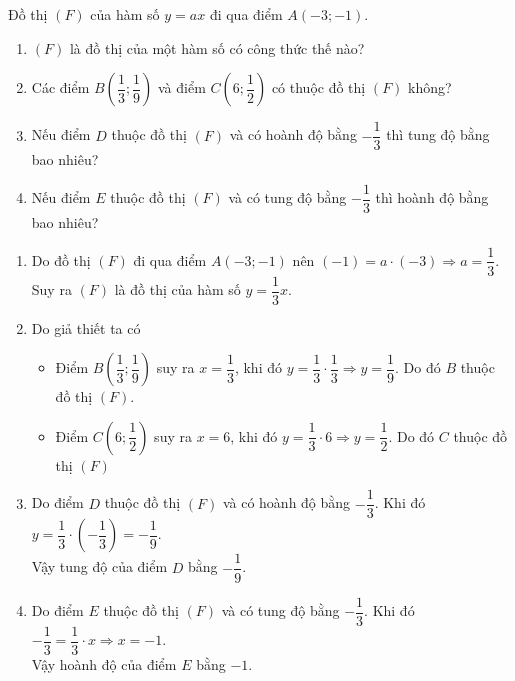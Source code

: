 \begin{bt}%
Đồ thị $\left(F\right)$	của hàm số $y = ax$ đi qua điểm $A\left(- 3; -1\right)$.
	\begin{enumerate}
		\item $\left(F\right)$ là đồ thị của một hàm số có công thức thế nào?
		\item Các điểm $B\left(\dfrac{1}{3}; \dfrac{1}{9}\right)$ và điểm  $C\left(6; \dfrac{1}{2}\right)$ có thuộc đồ thị $\left(F\right)$ không? 
		\item Nếu điểm $D$ thuộc đồ thị $\left(F\right)$ và có hoành độ bằng $-\dfrac{1}{3}$ thì tung độ bằng bao nhiêu? 
		\item Nếu điểm $E$ thuộc đồ thị $\left(F\right)$ và có tung  độ bằng $-\dfrac{1}{3}$ thì hoành độ bằng bao nhiêu?
	\end{enumerate}
	\loigiai
	{\begin{enumerate}
			\item Do đồ thị $\left(F\right)$ đi qua điểm $A\left(- 3; -1\right)$ nên  $(- 1) = a\cdot (- 3)\Rightarrow a = \dfrac{1}{3}$.\\
			Suy ra $\left(F\right)$ là đồ thị của hàm số $y = \dfrac{1}{3}x$. 
			\item Do giả thiết ta có
			\begin{itemize}
			\item Điểm $B\left(\dfrac{1}{3}; \dfrac{1}{9}\right)$ suy ra $x = \dfrac{1}{3}$, khi đó $y = \dfrac{1}{3}\cdot \dfrac{1}{3}\Rightarrow y = \dfrac{1}{9}$. Do đó $B$ thuộc đồ thị $\left(F\right)$.
			\item Điểm $C\left(6; \dfrac{1}{2}\right)$ suy ra $x = 6$, khi đó $y = \dfrac{1}{3}\cdot 6\Rightarrow y = \dfrac{1}{2}$. Do đó $C$ thuộc đồ thị $\left(F\right)$
		\end{itemize}
		\item Do điểm $D$ thuộc đồ thị $\left(F\right)$ và có hoành độ bằng $-\dfrac{1}{3}$. Khi đó $y = \dfrac{1}{3}\cdot\left(-\dfrac{1}{3}\right) = -\dfrac{1}{9}$.\\
		Vậy tung độ của điểm $D$ bằng $-\dfrac{1}{9}$.
			\item Do điểm $E$ thuộc đồ thị $\left(F\right)$ và có tung  độ bằng $-\dfrac{1}{3}$. Khi đó $- \dfrac{1}{3} = \dfrac{1}{3}\cdot x\Rightarrow x = - 1$.\\
			Vậy hoành độ của điểm $E$ bằng $-1$.
		\end{enumerate}	
	}
\end{bt}
